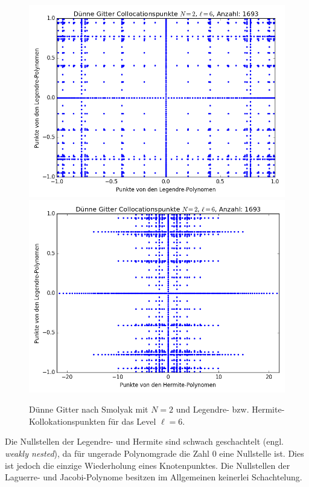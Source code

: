 \begin{figure}[!htb]
  \includegraphics[width=\linewidth]{Figures/sparse_grid_legendre_legendre.png}
\endminipage
{}
  \includegraphics[width=\linewidth]{Figures/sparse_grid_hermite_legendre.png}
\endminipage
\caption{Dünne Gitter nach Smolyak mit $N=2$ und Legendre- bzw. Hermite-Kollokationspunkten für das Level $\ell=6$.}
\label{fig:grids}
\end{figure}
Die Nullstellen der Legendre- und Hermite sind schwach geschachtelt (engl. \emph{weakly nested}), da für ungerade Polynomgrade die Zahl $0$ eine Nullstelle ist. Dies ist jedoch die einzige Wiederholung eines Knotenpunktes. Die Nullstellen der Laguerre- und Jacobi-Polynome besitzen im Allgemeinen keinerlei Schachtelung.\\
